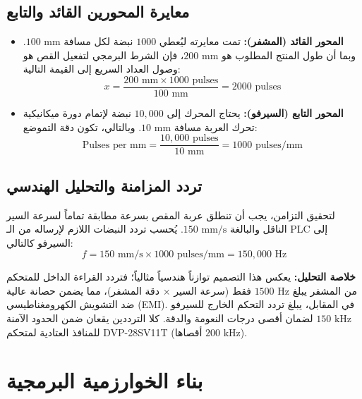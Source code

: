 \documentclass[12pt,a4paper,fleqn]{report}
\begin{document}
\section{معايرة المحورين القائد والتابع}
\begin{itemize}
    \item \textbf{المحور القائد (المشفر):} تمت معايرته ليُعطي $1000$ نبضة لكل مسافة $100\text{ mm}$. وبما أن طول المنتج المطلوب هو $200\text{ mm}$، فإن الشرط البرمجي لتفعيل القص هو وصول العداد السريع إلى القيمة التالية:
    $$x = \frac{200\text{ mm} \times 1000\text{ pulses}}{100\text{ mm}} = 2000\text{ pulses}$$

    \item \textbf{المحور التابع (السيرفو):} يحتاج المحرك إلى $10,000$ نبضة لإتمام دورة ميكانيكية تحرك العربة مسافة $10\text{ mm}$. وبالتالي، تكون دقة التموضع:
    $$\text{Pulses per mm} = \frac{10,000\text{ pulses}}{10\text{ mm}} = 1000\text{ pulses/mm}$$
\end{itemize}

\section{تردد المزامنة والتحليل الهندسي}
لتحقيق التزامن، يجب أن تنطلق عربة المقص بسرعة مطابقة تماماً لسرعة السير الناقل والبالغة $150\text{ mm/s}$. يُحسب تردد النبضات اللازم لإرساله من الـ \textenglish{PLC} إلى السيرفو كالتالي:
$$f = 150\text{ mm/s} \times 1000\text{ pulses/mm} = 150,000\text{ Hz}$$

\textbf{خلاصة التحليل:} يعكس هذا التصميم توازناً هندسياً مثالياً؛ فتردد القراءة الداخل للمتحكم من المشفر يبلغ $1500\text{ Hz}$ فقط (سرعة السير $\times$ دقة المشفر)، مما يضمن حصانة عالية ضد التشويش الكهرومغناطيسي (\textenglish{EMI}). في المقابل، يبلغ تردد التحكم الخارج للسيرفو $150\text{ kHz}$ لضمان أقصى درجات النعومة والدقة. كلا الترددين يقعان ضمن الحدود الآمنة للمنافذ العتادية لمتحكم \textenglish{DVP-28SV11T} (أقصاها $200\text{ kHz}$).




















\chapter{بناء الخوارزمية البرمجية}
\label{ch:software_implementation}
\end{document}

